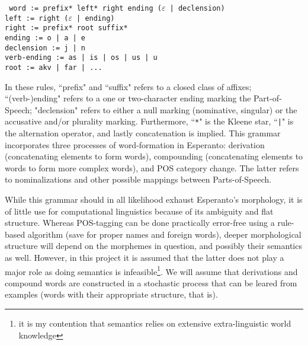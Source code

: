 \documentclass[10pt,a4paper]{article}
\begin{document}
\texttt{
word := prefix* left* right ending ($\varepsilon$ | declension) \\
left := right ($\varepsilon$ | ending) \\
right := prefix* root suffix* \\
ending := o | a | e \\
declension := j | n \\
verb-ending := as | is | os | us | u \\
root := akv | far | ...
}

In these rules, ``prefix" and ``suffix" refers to a closed class of affixes;
``(verb-)ending" refers to a one or two-character ending marking the
Part-of-Speech; "declension" refers to either a null marking (nominative,
singular) or the accusative and/or plurality marking. Furthermore,
``\texttt{*}" is the Kleene star, ``\texttt{|}" is the alternation operator,
and lastly concatenation is implied. This grammar incorporates three processes
of word-formation in Esperanto: derivation (concatenating elements to form
words), compounding (concatenating elements to words to form more complex
words), and POS category change.  The latter refers to nominalizations and
other possible mappings between Parts-of-Speech.

While this grammar should in all likelihood exhaust Esperanto's morphology, 
it is of little use for computational linguistics because of its ambiguity
and flat structure.  Whereas POS-tagging can be done practically error-free
using a rule-based algorithm (save for proper names and foreign words), deeper
morphological structure will depend on the morphemes in question, and possibly
their semantics as well. However, in this project it is assumed that the latter
does not play a major role as doing semantics is infeasible\footnote{it is my
contention that semantics relies on extensive extra-linguistic world
knowledge}. We will assume that derivations and compound words are constructed
in a stochastic process that can be leared from examples (words with their
appropriate structure, that is).
\end{document}
